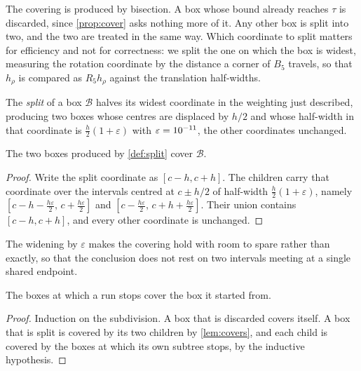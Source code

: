 \documentclass[a4paper,UKenglish,cleveref,autoref,thm-restate,numberwithinsect]{lipics-v2021}
\begin{document}
The covering is produced by bisection. A box whose bound already reaches $\tau$
is discarded, since \cref{prop:cover} asks nothing more of it. Any other box is
split into two, and the two are treated in the same way. Which coordinate to
split matters for efficiency and not for correctness: we split the one on which
the box is widest, measuring the rotation coordinate by the distance a corner of
$B_5$ travels, so that $h_\rho$ is compared as $R_5h_\rho$ against the
translation half-widths.

\begin{definition}
\label{def:split}
The \emph{split} of a box $\mathcal{B}$ halves its widest coordinate in the
weighting just described, producing two boxes whose centres are displaced by
$h/2$ and whose half-width in that coordinate is $\tfrac{h}{2}(1+\varepsilon)$
with $\varepsilon=10^{-11}$, the other coordinates unchanged.
\end{definition}

\begin{lemma}
\label{lem:covers}
The two boxes produced by \cref{def:split} cover $\mathcal{B}$.
\end{lemma}

\begin{proof}
Write the split coordinate as $[c-h,c+h]$. The children carry that coordinate
over the intervals centred at $c\pm h/2$ of half-width
$\tfrac{h}{2}(1+\varepsilon)$, namely
$[c-h-\tfrac{h\varepsilon}{2},\,c+\tfrac{h\varepsilon}{2}]$ and
$[c-\tfrac{h\varepsilon}{2},\,c+h+\tfrac{h\varepsilon}{2}]$. Their union
contains $[c-h,c+h]$, and every other coordinate is unchanged.
\end{proof}

The widening by $\varepsilon$ makes the covering hold with room to spare rather
than exactly, so that the conclusion does not rest on two intervals meeting at a
single shared endpoint.

\begin{corollary}
\label{cor:leavescover}
The boxes at which a run stops cover the box it started from.
\end{corollary}

\begin{proof}
Induction on the subdivision. A box that is discarded covers itself. A box that
is split is covered by its two children by \cref{lem:covers}, and each child is
covered by the boxes at which its own subtree stops, by the inductive hypothesis.
\end{proof}
\end{document}
